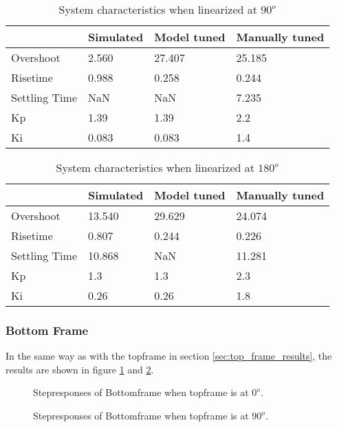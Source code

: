 \documentclass[../../Main]{subfiles}
\begin{document}
\begin{table}[H]
	\centering
	\begin{tabular}{l|*{3}{l}}
		&Simulated&Model tuned&Manually tuned\\
		\hline
		Overshoot&2.560&27.407&25.185\\
		Risetime&0.988&0.258&0.244\\
		Settling Time&NaN&NaN&7.235\\
		Kp&1.39&1.39&2.2\\
		Ki&0.083&0.083&1.4
	\end{tabular}
	\caption{System characteristics when linearized at $90^o$}
	\label{tab:90_top}
\end{table}


\begin{table}[H]
	\centering
	\begin{tabular}{l|*{3}{l}}
		&Simulated&Model tuned&Manually tuned\\
		\hline
		Overshoot&13.540&29.629&24.074\\
		Risetime&0.807&0.244&0.226\\
		Settling Time&10.868&NaN&11.281\\
		Kp&1.3&1.3&2.3\\
		Ki&0.26&0.26&1.8
	\end{tabular}
	\caption{System characteristics when linearized at $180^o$}
	\label{tab:180_top}
\end{table}



\subsubsection{Bottom Frame}%
\label{sec:bottom_frame_results}

In the same way as with the topframe in section \ref{sec:top_frame_results}, the results are shown in figure \ref{fig:bot_0} and \ref{fig:bot_90}.

\begin{figure}[H]
  \def\svgwidth{\textwidth}
  
  \caption{Stepresponses of Bottomframe when topframe is at $0^o$.}
  \label{fig:bot_0}
\end{figure}

\begin{figure}[H]
 \def\svgwidth{\textwidth}
 
  \caption{Stepresponses of Bottomframe when topframe is at $90^o$.}
  \label{fig:bot_90}
\end{figure}
\end{document}
